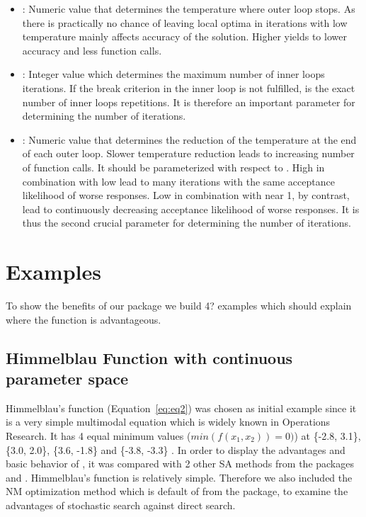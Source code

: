 \begin{itemize}
\item {}: Numeric value that determines the temperature where outer loop stops. As there is practically no chance of leaving local optima in iterations with low temperature  mainly affects accuracy of the solution. Higher  yields to lower accuracy and less function calls.
\item {}: Integer value which determines the maximum number of inner loops iterations. If the break criterion in the inner loop is not fulfilled,  is the exact number of inner loops repetitions. It is therefore an important parameter for determining the number of iterations.
\item {}: Numeric value that determines the reduction of the temperature at the end of each outer loop. Slower temperature reduction leads to increasing number of function calls. It should be parameterized with respect to . High  in combination with low  lead to many iterations with the same acceptance likelihood of worse responses. Low  in combination with  near 1, by contrast, lead to continuously decreasing acceptance likelihood of worse responses. It is thus the second crucial parameter for determining the number of iterations.
\end{itemize}

\section{Examples}
To show the benefits of our  package we build 4? examples which should explain where the  function is advantageous.

\subsection{Himmelblau Function with continuous parameter space}
Himmelblau's function (Equation~\ref{eq:eq2}) \citep{himmelblau_1972} was chosen as initial example since it is a very simple multimodal equation which is widely known in Operations Research. It has 4 equal minimum values ($min(f(x_1,x_2))=0)$) at \{-2.8, 3.1\}, \{3.0, 2.0\}, \{3.6, -1.8\} and \{-3.8, -3.3\} . In order to display the advantages and basic behavior of , it was compared with 2 other SA methods from the packages  and . Himmelblau's function is relatively simple. Therefore we  also included the NM optimization method \citep{nelder_1965} which is default of  from the  package, to examine the advantages of stochastic search against direct search.

